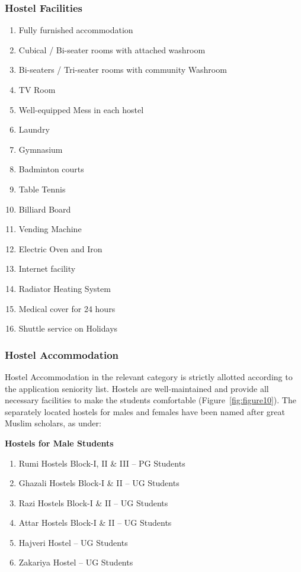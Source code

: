 \hypertarget{hostel-facilities}{%
\subsubsection{Hostel Facilities}\label{hostel-facilities}}

\begin{enumerate}[itemsep=1pt, topsep=2pt, parsep=0pt]
\item Fully furnished accommodation
\item Cubical / Bi-seater rooms with attached washroom
\item Bi-seaters / Tri-seater rooms with community Washroom
\item TV Room
\item Well-equipped Mess in each hostel
\item Laundry
\item Gymnasium
\item Badminton courts
\item Table Tennis
\item Billiard Board
\item Vending Machine
\item Electric Oven and Iron
\item Internet facility
\item Radiator Heating System
\item Medical cover for 24 hours
\item Shuttle service on Holidays
\end{enumerate}

\hypertarget{hostel-accommodation}{%
\subsubsection{Hostel Accommodation}\label{hostel-accommodation}}

Hostel Accommodation in the relevant category is strictly allotted according to the application seniority list. Hostels are well-maintained and provide all necessary facilities to make the students comfortable (Figure~\ref{fig:figure10}). The separately located hostels for males and females have been named after great Muslim scholars, as under:

\noindent\textbf{Hostels for Male Students}

\begin{enumerate}[itemsep=1pt, topsep=3pt, parsep=0pt]
    \item Rumi Hostels Block-I, II \& III -- PG Students
    \item Ghazali Hostels Block-I \& II -- UG Students
    \item Razi Hostels Block-I \& II -- UG Students
    \item Attar Hostels Block-I \& II -- UG Students
    \item Hajveri Hostel -- UG Students
    \item Zakariya Hostel -- UG Students
\end{enumerate}

